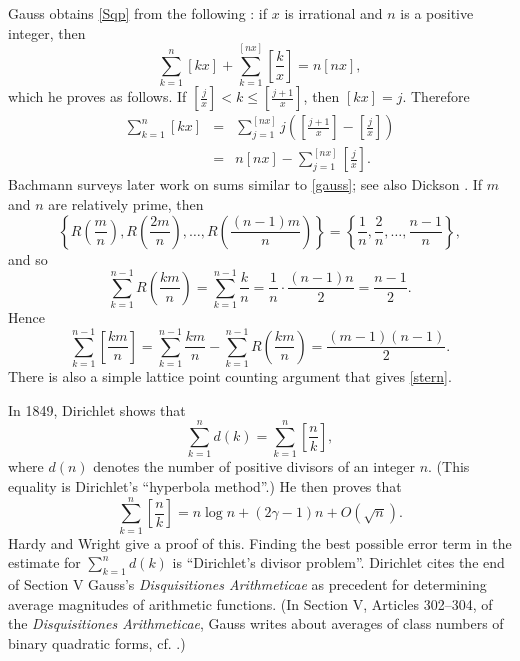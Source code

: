 \documentclass{article}
\begin{document}
Gauss obtains \eqref{Sqp} from the following \cite[p.~116, \S 5]{smith}:
if $x$ is irrational and $n$ is a positive integer, then
\begin{equation}
\sum_{k=1}^n [kx]+\sum_{k=1}^{[nx]} \left[ \frac{k}{x} \right]=n[nx],
\label{gauss}
\end{equation}
which he proves as follows.
If $\left[\frac{j}{x}\right] < k \leq \left[\frac{j+1}{x}\right]$, then $[kx]=j$. Therefore
\begin{eqnarray*}
\sum_{k=1}^n [kx]&=&\sum_{j=1}^{[nx]} j \left( \left[\frac{j+1}{x} \right]- \left[\frac{j}{x} \right] \right)\\
&=&n[nx]-\sum_{j=1}^{[nx]}  \left[\frac{j}{x} \right].
\end{eqnarray*}
Bachmann \cite[pp.~654--658, \S 4]{bachmann1904} surveys later work on sums similar to \eqref{gauss}; see also Dickson \cite[Chapter X]{dicksonI}.
If $m$ and $n$ are relatively prime, then
\[
\left\{R\left(\frac{m}{n}\right), R\left(\frac{2m}{n}\right), \ldots, R\left(\frac{(n-1)m}{n}\right)\right\} =\left\{\frac{1}{n},\frac{2}{n},\ldots,\frac{n-1}{n}\right\},
\]
and so
\[
\sum_{k=1}^{n-1} R\left( \frac{km}{n} \right)=\sum_{k=1}^{n-1} \frac{k}{n}=\frac{1}{n} \cdot \frac{(n-1)n}{2}=\frac{n-1}{2}.
\]
Hence
\begin{equation}
\sum_{k=1}^{n-1} \left[ \frac{km}{n} \right] = \sum_{k=1}^{n-1} \frac{km}{n} - \sum_{k=1}^{n-1} R\left( \frac{km}{n} \right)=\frac{(m-1)(n-1)}{2}.
\label{stern}
\end{equation}
There is also a simple lattice point counting argument \cite[p.~113, No.~18]{polyaII} that gives \eqref{stern}.

In 1849, Dirichlet \cite{mittleren} shows that 
\[
\sum_{k=1}^n d(k) = \sum_{k=1}^n \left[  \frac{n}{k} \right],
\]
where $d(n)$ denotes the number of positive divisors of an integer $n$. (This equality is Dirichlet's ``hyperbola method''.) He then proves that
\[
\sum_{k=1}^n \left[  \frac{n}{k} \right] = n \log n + (2\gamma -1)n +O(\sqrt{n}).
\]
Hardy and Wright \cite[pp.~264--265, Theorem 320]{wright} give a proof of this.
Finding the best possible error term in the estimate for $\sum_{k=1}^n d(k)$ is ``Dirichlet's divisor problem''.  Dirichlet cites  
the end of Section V Gauss's {\em Disquisitiones Arithmeticae}
as precedent for determining average magnitudes of arithmetic functions. (In Section V, Articles 302--304, of the {\em Disquisitiones Arithmeticae},
Gauss writes about averages of class numbers of binary quadratic forms, cf. \cite[Chapter VI]{dicksonIII}.)
\end{document}
